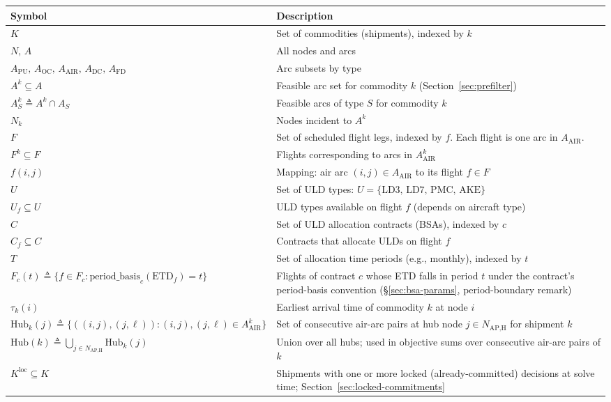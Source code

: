 \documentclass[11pt,a4paper]{article}
\newcommand{\defeq}{\triangleq}
\theoremstyle{definition}
\begin{document}
\begin{center}
\begin{tabular}{lp{11.5cm}}
\toprule
Symbol & Description \\
\midrule
$K$ & Set of commodities (shipments), indexed by $k$ \\
$N,\, A$ & All nodes and arcs \\
$A_{\text{PU}},\, A_{\text{OC}},\, A_{\text{AIR}},\, A_{\text{DC}},\, A_{\text{FD}}$ & Arc subsets by type \\
$A^k \subseteq A$ & Feasible arc set for commodity $k$ (Section~\ref{sec:prefilter}) \\
$A^k_S \defeq A^k \cap A_S$ & Feasible arcs of type $S$ for commodity $k$ \\
$N_k$ & Nodes incident to $A^k$ \\
$F$ & Set of scheduled flight legs, indexed by $f$. Each flight is one arc in $A_{\text{AIR}}$. \\
$F^k \subseteq F$ & Flights corresponding to arcs in $A^k_{\text{AIR}}$ \\
$f(i,j)$ & Mapping: air arc $(i,j) \in A_{\text{AIR}}$ to its flight $f \in F$ \\
$U$ & Set of ULD types: $U = \{\text{LD3, LD7, PMC, AKE}\}$ \\
$U_f \subseteq U$ & ULD types available on flight $f$ (depends on aircraft type) \\
$C$ & Set of ULD allocation contracts (BSAs), indexed by $c$ \\
$C_f \subseteq C$ & Contracts that allocate ULDs on flight $f$ \\
$T$ & Set of allocation time periods (e.g., monthly), indexed by $t$ \\
$F_c(t) \defeq \{f \in F_c : \text{period\_basis}_c(\text{ETD}_f) = t\}$ & Flights of contract $c$ whose ETD falls in period $t$ under the contract's period-basis convention (\S\ref{sec:bsa-params}, period-boundary remark) \\
$\tau_k(i)$ & Earliest arrival time of commodity $k$ at node $i$ \\
$\text{Hub}_k(j) \defeq \{((i,j), (j,\ell)) : (i,j), (j,\ell) \in A^k_{\text{AIR}}\}$ & Set of consecutive air-arc pairs at hub node $j \in N_{\text{AP,H}}$ for shipment $k$ \\
$\text{Hub}(k) \defeq \bigcup_{j \in N_{\text{AP,H}}} \text{Hub}_k(j)$ & Union over all hubs; used in objective sums over consecutive air-arc pairs of $k$ \\
$K^{\text{loc}} \subseteq K$ & Shipments with one or more locked (already-committed) decisions at solve time; Section~\ref{sec:locked-commitments} \\

\end{tabular}
\end{center}
\end{document}
